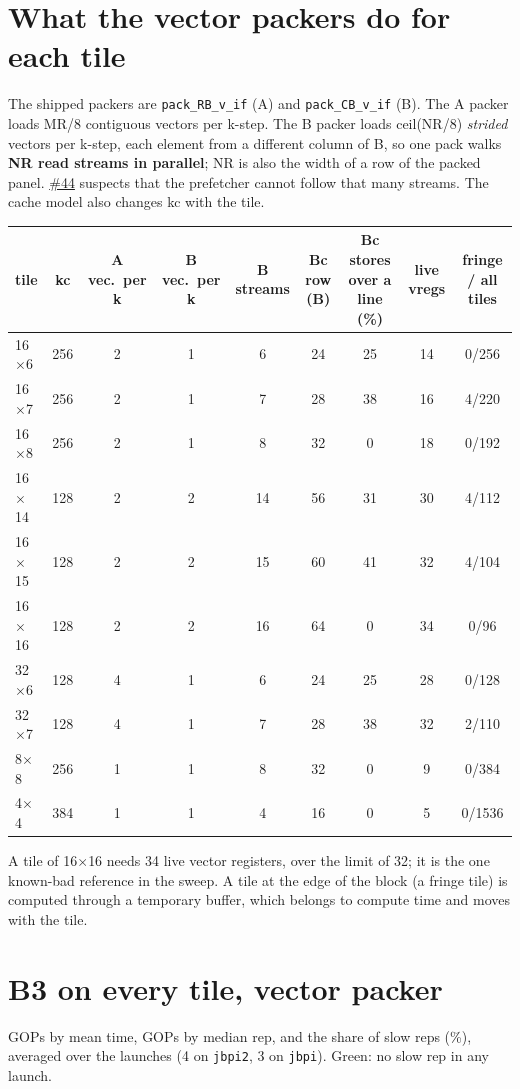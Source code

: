\documentclass[10pt,a4paper]{article}
\newcommand{\iss}[1]{\href{https://github.com/JieGH/RVV_code_gen_via_MLIR_xDSL/issues/#1}{\##1}}
\begin{document}
\section{What the vector packers do for each tile}
The shipped packers are \texttt{pack\_RB\_v\_if} (A) and \texttt{pack\_CB\_v\_if} (B). The A packer loads MR/8 contiguous
vectors per k-step. The B packer loads ceil(NR/8) \emph{strided} vectors per k-step, each element from a different
column of B, so one pack walks \textbf{NR read streams in parallel}; NR is also the width of a row of the packed panel.
\iss{44} suspects that the prefetcher cannot follow that many streams. The cache model also changes kc with the tile.

\begin{center}\footnotesize\setlength{\tabcolsep}{3pt}
\begin{tabular}{@{}lcccccccc@{}}
\toprule
tile & kc & A vec.\ per k & B vec.\ per k & B streams & Bc row (B) & Bc stores over a line (\%) & live vregs & fringe / all tiles \\
\midrule
16$\times$6 & 256 & 2 & 1 & 6 & 24 & 25 & 14 & 0/256 \\
16$\times$7 & 256 & 2 & 1 & 7 & 28 & 38 & 16 & 4/220 \\
16$\times$8 & 256 & 2 & 1 & 8 & 32 & 0 & 18 & 0/192 \\
16$\times$14 & 128 & 2 & 2 & 14 & 56 & 31 & 30 & 4/112 \\
16$\times$15 & 128 & 2 & 2 & 15 & 60 & 41 & 32 & 4/104 \\
16$\times$16 & 128 & 2 & 2 & 16 & 64 & 0 & 34 & 0/96 \\
32$\times$6 & 128 & 4 & 1 & 6 & 24 & 25 & 28 & 0/128 \\
32$\times$7 & 128 & 4 & 1 & 7 & 28 & 38 & 32 & 2/110 \\
8$\times$8 & 256 & 1 & 1 & 8 & 32 & 0 & 9 & 0/384 \\
4$\times$4 & 384 & 1 & 1 & 4 & 16 & 0 & 5 & 0/1536 \\
\bottomrule
\end{tabular}
\end{center}
A tile of 16$\times$16 needs 34 live vector registers, over the limit of 32; it is the one known-bad reference in the
sweep. A tile at the edge of the block (a fringe tile) is computed through a temporary buffer, which belongs to compute
time and moves with the tile.

\section{B3 on every tile, vector packer}
\label{sec:b3vector}
GOPs by mean time, GOPs by median rep, and the share of slow reps (\%), averaged over the launches (4 on \texttt{jbpi2},
3 on \texttt{jbpi}). Green: no slow rep in any launch.
\end{document}
